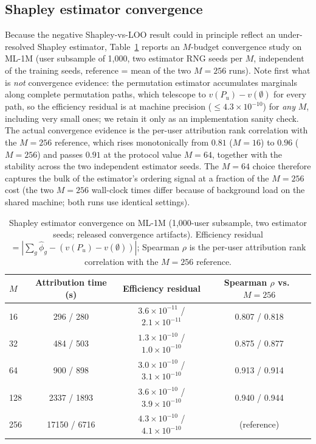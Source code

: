 \documentclass[pdflatex,sn-mathphys-num]{sn-jnl}
\begin{document}
\subsection{Shapley estimator convergence}\label{subsec:estimator_convergence}

Because the negative Shapley-vs-LOO result could in principle reflect an under-resolved Shapley estimator, Table~\ref{tab:estimator_convergence} reports an $M$-budget convergence study on ML-1M (user subsample of 1,000, two estimator RNG seeds per $M$, independent of the training seeds, reference = mean of the two $M=256$ runs). Note first what is \emph{not} convergence evidence: the permutation estimator accumulates marginals along complete permutation paths, which telescope to $v(P_u)-v(\emptyset)$ for every path, so the efficiency residual is at machine precision ($\le4.3\times10^{-10}$) for \emph{any} $M$, including very small ones; we retain it only as an implementation sanity check. The actual convergence evidence is the per-user attribution rank correlation with the $M=256$ reference, which rises monotonically from $0.81$ ($M=16$) to $0.96$ ($M=256$) and passes $0.91$ at the protocol value $M=64$, together with the stability across the two independent estimator seeds. The $M=64$ choice therefore captures the bulk of the estimator's ordering signal at a fraction of the $M=256$ cost (the two $M=256$ wall-clock times differ because of background load on the shared machine; both runs use identical settings).

\begin{table}[t]
\caption{Shapley estimator convergence on ML-1M (1,000-user subsample, two estimator seeds; released convergence artifacts). Efficiency residual $=|\sum_g\hat\phi_g-(v(P_u)-v(\emptyset))|$; Spearman $\rho$ is the per-user attribution rank correlation with the $M=256$ reference.}\label{tab:estimator_convergence}
\centering
\small
\begin{tabular}{lccc}
\toprule
$M$ & Attribution time (s) & Efficiency residual & Spearman $\rho$ vs.\ $M=256$ \\
\midrule
16  & 296 / 280    & $3.6\times10^{-11}$ / $2.1\times10^{-11}$ & 0.807 / 0.818 \\
32  & 484 / 503    & $1.3\times10^{-10}$ / $1.0\times10^{-10}$ & 0.875 / 0.877 \\
64  & 900 / 898    & $3.0\times10^{-10}$ / $3.1\times10^{-10}$ & 0.913 / 0.914 \\
128 & 2337 / 1893  & $3.6\times10^{-10}$ / $3.9\times10^{-10}$ & 0.940 / 0.944 \\
256 & 17150 / 6716 & $4.3\times10^{-10}$ / $4.1\times10^{-10}$ & (reference) \\
\bottomrule
\end{tabular}
\end{table}
\end{document}

